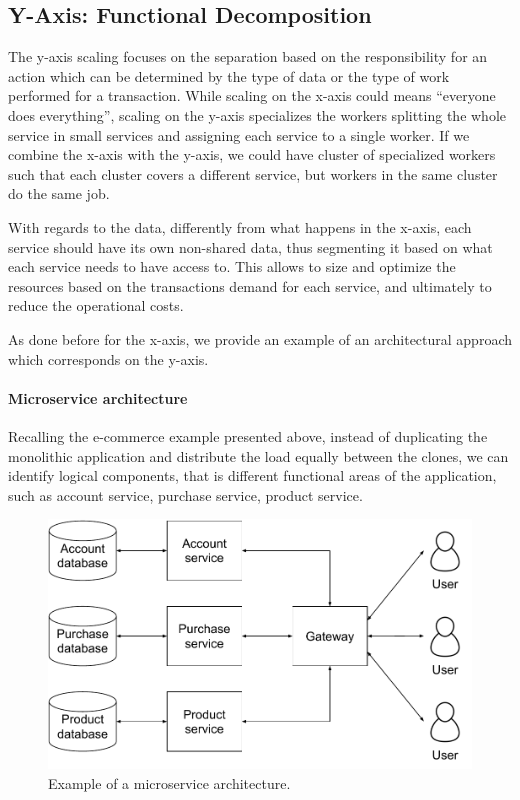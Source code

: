 \subsection{Y-Axis: Functional Decomposition}
\label{sec:y-axis}
The y-axis scaling focuses on the separation based on the responsibility for an
action which can be determined by the type of data or the type of work performed
for a transaction. While scaling on the x-axis could means ``everyone does
everything'', scaling on the y-axis specializes the workers splitting the whole
service in small services and assigning each service to a single worker. If we
combine the x-axis with the y-axis, we could have cluster of specialized workers
such that each cluster covers a different service, but workers in the same
cluster do the same job.

With regards to the data, differently from what happens in the x-axis, each
service should have its own non-shared data, thus segmenting it based on what
each service needs to have access to. This allows to size and optimize the
resources based on the transactions demand for each service, and ultimately to
reduce the operational costs.

As done before for the x-axis, we provide an example of an architectural
approach which corresponds on the y-axis.

\paragraph{Microservice architecture}
Recalling the e-commerce example presented above, instead of duplicating the
monolithic application and distribute the load equally between the clones, we
can identify logical components, that is different functional areas of the
application, such as account service, purchase service, product service.

\begin{figure}
	\begin{center}
		\includegraphics[width=.7\textwidth]{./res/img/microservice-architecture.pdf}
	\end{center}
	\caption{Example of a microservice architecture.}
	\label{fig:microservice-architecture}
\end{figure}

